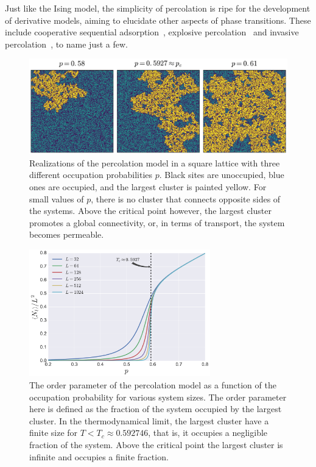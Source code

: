 Just like the Ising model, the simplicity of percolation is ripe for the
development of derivative models, aiming to elucidate other aspects of phase
transitions. These include cooperative sequential adsorption~\cite{Araujo2013},
explosive percolation~\cite{Achlioptas2009} and invasive
percolation~\cite{Wilkinson1983}, to name just a few.


\begin{figure}
\begin{center}
    \includegraphics[width=\textwidth]{chapters/ch2-crit/figs/isoperco}
\end{center}
\caption{Realizations of the percolation model in a square lattice with three
    different occupation probabilities $p$. Black sites are unoccupied, blue
    ones are occupied, and the largest cluster is painted yellow. For small
    values of $p$, there is no cluster that connects opposite sides of the
    systems. Above the critical point however, the largest cluster promotes a
    global connectivity, or, in terms of transport, the system becomes
    permeable.}
\label{fig:isoperco}
\end{figure}

\begin{figure}
\begin{center}
    \includegraphics[width=0.7\textwidth]{chapters/ch2-crit/figs/isoperco2}
\end{center}
\caption{The order parameter of the percolation model as a function of the
    occupation probability for various system sizes. The order parameter here
    is defined as the fraction of the system occupied by the largest cluster.
    In the thermodynamical limit, the largest cluster have a finite size for
    $T<T_c\approx 0.592746$, that is, it occupies a negligible fraction of the
    system. Above the critical point the largest cluster is infinite and occupies
    a finite fraction.}
\label{fig:isoperco2}
\end{figure}

